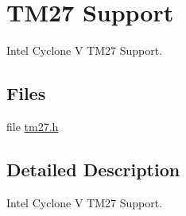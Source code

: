 \hypertarget{group__RTEMSBSPsARMCycTM27}{}\section{T\+M27 Support}
\label{group__RTEMSBSPsARMCycTM27}


Intel Cyclone V T\+M27 Support.  


\subsection*{Files}
\begin{DoxyCompactItemize}
\item 
file \mbox{\hyperlink{arm_2altera-cyclone-v_2include_2tm27_8h}{tm27.\+h}}
\end{DoxyCompactItemize}


\subsection{Detailed Description}
Intel Cyclone V T\+M27 Support. 

